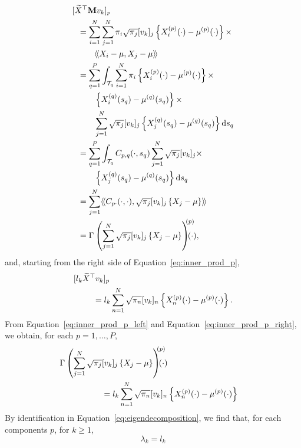 \begin{align}\label{eq:inner_prod_p_left}
[\widetilde{X}^\top \mathbf{M} v_k]_p & \\
    &\mkern-72mu = \sum_{i = 1}^N \sum_{j = 1}^N \pi_i \sqrt{\pi_j} [v_{k}]_j \left\{X_i^{(p)}(\cdot) - \mu^{(p)}(\cdot)\right\} \times \\
    &\mkern-36mu \inH{X_i - \mu}{X_j - \mu}\\
    &\mkern-72mu = \sum_{q = 1}^P \int_{\TT{q}} \sum_{i = 1}^N \pi_i\left\{X_i^{(p)}(\cdot) - \mu^{(p)}(\cdot)\right\} \times \\
    &\mkern-36mu \left\{X_i^{(q)}(s_q) - \mu^{(q)}(s_q)\right\} \times \\
    &\mkern-36mu \sum_{j = 1}^N \sqrt{\pi_j}[v_{k}]_j \left\{X_j^{(q)}(s_q) - \mu^{(q)}(s_q)\right\} \dd s_q \\
    &\mkern-72mu = \sum_{q = 1}^P \int_{\TT{q}} C_{p,q}(\cdot, s_q)\sum_{j = 1}^N \sqrt{\pi_j}[v_{k}]_j \times \\
    &\mkern-36mu \left\{X_j^{(q)}(s_q) - \mu^{(q)}(s_q)\right\} \dd s_q \\
    &\mkern-72mu = \sum_{j = 1}^N \inH{C_{p \cdot}(\cdot, \cdot)}{\sqrt{\pi_j}[v_{k}]_j \left\{X_j - \mu\right\}} \\
    &\mkern-72mu = \Gamma\left(\sum_{j = 1}^N \sqrt{\pi_j}[v_{k}]_j \left\{X_j - \mu\right\} \right)^{\mkern-9mu(p)}\mkern-18mu(\cdot),
\end{align}
and, starting from the right side of Equation~\eqref{eq:inner_prod_p},
\begin{align}\label{eq:inner_prod_p_right}
    [l_k \widetilde{X}^\top v_k]_p & \\
    &\mkern-36mu = l_k \sum_{n = 1}^N \sqrt{\pi_n}[v_{k}]_n \left\{\Xnp(\cdot) - \mu^{(p)}(\cdot)\right\}.
\end{align}
From Equation~\eqref{eq:inner_prod_p_left} and Equation~\eqref{eq:inner_prod_p_right}, we obtain, for each $p = 1, \dots, P$,
\begin{align*}
    \Gamma\left(\sum_{j = 1}^N \sqrt{\pi_j}[v_{k}]_j \left\{X_j - \mu\right\}\right)^{\mkern-9mu(p)}\mkern-18mu(\cdot) \\
    &\mkern-144mu = l_k \sum_{n = 1}^N \sqrt{\pi_n}[v_{k}]_n \left\{\Xnp(\cdot) - \mu^{(p)}(\cdot)\right\}
\end{align*}
By identification in Equation~\eqref{eq:eigendecomposition}, we find that, for each components $p$, for $k \geq 1$,
\begin{equation}
\lambda_k = l_k  
\end{equation}
